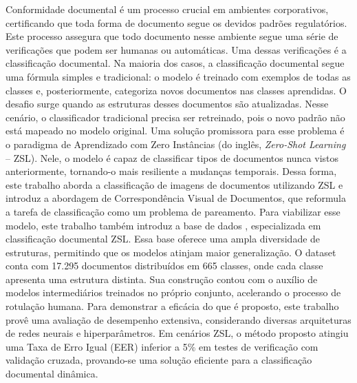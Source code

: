 Conformidade documental é um processo crucial em ambientes corporativos, certificando que toda forma de documento segue os devidos padrões regulatórios. Este processo assegura que todo documento nesse ambiente segue uma série de verificações que podem ser humanas ou automáticas. Uma dessas verificações é a classificação documental. Na maioria dos casos, a classificação documental segue uma fórmula simples e tradicional: o modelo é treinado com exemplos de todas as classes e, posteriormente, categoriza novos documentos nas classes aprendidas. 
O desafio surge quando as estruturas desses documentos são atualizadas. Nesse cenário, o classificador tradicional precisa ser retreinado, pois o novo padrão não está mapeado no modelo original. Uma solução promissora para esse problema é o paradigma de Aprendizado com Zero Instâncias (do inglês, \textit{Zero-Shot Learning} -- ZSL). Nele, o modelo é capaz de classificar tipos de documentos nunca vistos anteriormente, tornando-o mais resiliente a mudanças temporais.
Dessa forma, este trabalho aborda a classificação de imagens de documentos utilizando ZSL e introduz a abordagem de Correspondência Visual de Documentos, que reformula a tarefa de classificação como um problema de pareamento.
Para viabilizar esse modelo, este trabalho também introduz a base de dados , especializada em classificação documental {ZSL}.
Essa base oferece uma ampla diversidade de estruturas, permitindo que os modelos atinjam maior generalização. O dataset conta com 17.295 documentos distribuídos em 665 classes, onde cada classe apresenta uma estrutura distinta. Sua construção contou com o auxílio de modelos intermediários treinados no próprio conjunto, acelerando o processo de rotulação humana.
Para demonstrar a eficácia do que é proposto, este trabalho provê uma avaliação de desempenho extensiva, considerando diversas arquiteturas de redes neurais e hiperparâmetros.
Em cenários ZSL, o método proposto atingiu uma Taxa de Erro Igual (EER) inferior a 5\% em testes de verificação com validação cruzada, provando-se uma solução eficiente para a classificação documental dinâmica.


